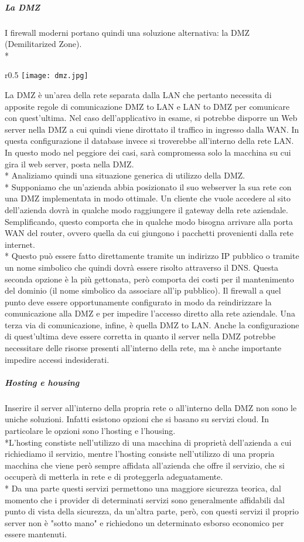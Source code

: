 \documentclass[12pt]{article}
\begin{document}
\bigskip
\subparagraph {La DMZ}
I firewall moderni portano quindi una soluzione alternativa: la DMZ (Demilitarized Zone).\\*
\begin{wrapfigure}{r}{0.5\textwidth}
    \texttt{[image: dmz.jpg]}
\end{wrapfigure}
La DMZ è un’area della rete separata dalla LAN che pertanto necessita di apposite regole di comunicazione DMZ to LAN e LAN to DMZ per comunicare con quest'ultima.
Nel caso dell’applicativo in esame, si potrebbe disporre un Web server nella DMZ a cui quindi viene dirottato il traffico in ingresso dalla WAN.
In questa configurazione il database invece si troverebbe all’interno della rete LAN.
In questo modo nel peggiore dei casi, sarà compromessa solo la macchina su cui gira il web server, posta nella DMZ.\\*
Analiziamo quindi una situazione generica di utilizzo della DMZ.\\*
Supponiamo che un'azienda abbia posizionato il suo webserver la sua rete con una DMZ implementata in modo ottimale. Un cliente che vuole accedere al sito dell'azienda dovrà in qualche modo raggiungere il gateway della rete aziendale. Semplificando, questo comporta che in qualche modo bisogna arrivare alla porta WAN del router, ovvero quella da cui giungono i pacchetti provenienti dalla rete internet.\\*
Questo può essere fatto direttamente tramite un indirizzo IP pubblico o tramite un nome simbolico che quindi dovrà essere risolto attraverso il DNS. Questa seconda opzione è la più gettonata, però comporta dei costi per il mantenimento del dominio (il nome simbolico da associare all'ip pubblico).
Il firewall a quel punto deve essere opportunamente configurato in modo da reindirizzare la comunicazione alla DMZ e per impedire l'accesso diretto alla rete aziendale. Una terza via di comunicazione, infine, è quella DMZ to LAN. Anche la configurazione di quest'ultima deve essere corretta in quanto il server nella DMZ potrebbe necessitare delle risorse presenti all'interno della rete, ma è anche importante impedire accessi indesiderati.

\bigskip
\subparagraph {Hosting e housing}
Inserire il server all'interno della propria rete o all'interno della DMZ non sono le uniche soluzioni. Infatti esistono opzioni che si basano su servizi cloud. In particolare le opzioni sono l'hosting e l'housing.
\\*L'hosting constiste nell'utilizzo di una macchina di proprietà dell'azienda a cui richiediamo il servizio, mentre l'hosting consiste nell'utilizzo di una propria macchina che viene però sempre affidata all'azienda che offre il servizio, che si occuperà di metterla in rete e di proteggerla adeguatamente.\\*
Da una parte questi servizi permettono una maggiore sicurezza teorica, dal momento che i provider di determinati servizi sono generalmente affidabili dal punto di vista della sicurezza, da un'altra parte, però, con questi servizi il proprio server non è "sotto mano" e richiedono un determinato esborso economico per essere mantenuti.
\end{document}
